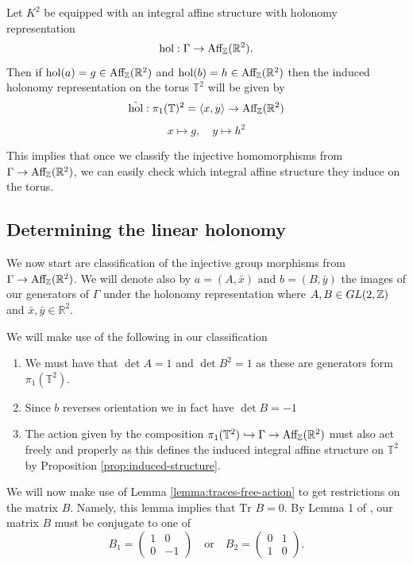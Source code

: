 \begin{prop} \label{prop:induced-structure}
    Let $K^2$ be equipped with an integral affine structure with holonomy representation
    $$\text{hol} : \Gamma \to \text{Aff}_{\mathbb{Z}}(\mathbb{R}^2).$$
    Then if $\text{hol}(a) = g \in \text{Aff}_{\mathbb{Z}}(\mathbb{R}^2)$ and $\text{hol}(b) = h \in \text{Aff}_{\mathbb{Z}}(\mathbb{R}^2)$ then the induced holonomy representation on the torus $\mathbb{T}^2$
    will be given by
    $$\tilde{\text{hol}} : \pi_1(\mathbb{T})^2 = \langle x,y \rangle \to \text{Aff}_{\mathbb{Z}}(\mathbb{R}^2)$$
    $$ x \mapsto g, \quad y \mapsto h^2$$
\end{prop}

\begin{remark}
    This implies that once we classify the injective homomorphisms from $\Gamma \to \text{Aff}_{\mathbb{Z}}(\mathbb{R}^2)$, we can easily check
    which integral affine structure they induce on the torus.
\end{remark}

\subsection{Determining the linear holonomy}
We now start are classification of the injective group morphisms from $\Gamma
    \to \text{Aff}_{\mathbb{Z}}(\mathbb{R}^2)$. We will denote also by $a = (A, \bar{x})$ and $b = (B,
    \bar{y})$ the images of our generators of $\Gamma$ under the holonomy
representation where $A,B \in GL(2, \mathbb{Z})$ and $\bar{x}, \bar{y} \in
    \mathbb{R}^2$.

We will make use of the following in our classification

\begin{enumerate}
    \item We must have that $\det A = 1$ and $\det B^2 = 1$ as these are generators form
          $\pi_1(\mathbb{T}^2)$.
    \item Since $b$ reverses orientation we in fact have $\det B = -1$
    \item The action given by the composition $\pi_1(\mathbb{T}^2) \hookrightarrow \Gamma
              \to \text{Aff}_{\mathbb{Z}}(\mathbb{R}^2) $ must also act freely and properly as this defines the induced
          integral affine structure on $\mathbb{T}^2$ by Proposition
          \ref{prop:induced-structure}.
\end{enumerate}

We will now make use of Lemma \ref{lemma:traces-free-action} to get
restrictions on the matrix $B$. Namely, this lemma implies that $\text{Tr } B =
    0$. By Lemma 1 of \cite{torus-bundles}, our matrix $B$ must be conjugate to one
of $$ B_1 = \begin{pmatrix}
        1 & 0  \\
        0 & -1
    \end{pmatrix}\quad \text{or} \quad
    B_2=\begin{pmatrix}
        0 & 1 \\
        1 & 0
    \end{pmatrix}.
$$

